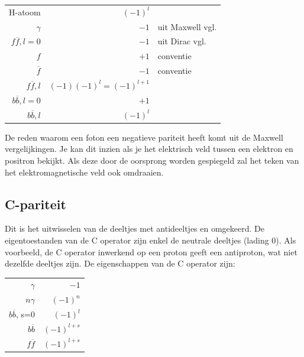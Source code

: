 \documentclass[../main.tex]{subfiles}
\begin{document}
\begin{table}[h]
    \centering
    \label{tab:par_eig}
    \begin{tabular}{r|rl}
        H-atoom             & $(-1)^l$                  &                   \\
        $\gamma$            & $-1$                      & uit Maxwell vgl.  \\
        $f\overline f,l=0$  & $-1$                      & uit Dirac vgl.    \\
        $f$                 & $+1$                      & conventie         \\
        $\overline f$       & $-1$                      & conventie         \\
        $f\overline f,l$    & $(-1)(-1)^l=(-1)^{l+1}$   &                   \\
        $b\overline b,l=0$  & $+1$                      &                   \\
        $b\overline b,l$    & $(-1)^l$                  &                   \\
    \end{tabular}
\end{table}

De reden waarom een foton een negatieve pariteit heeft komt uit de Maxwell vergelijkingen. Je kan dit inzien als je het elektrisch veld tussen een elektron en positron bekijkt. Als deze door de oorsprong worden gespiegeld zal het teken van het elektromagnetische veld ook omdraaien.

\subsection{C-pariteit}%
\label{sub:c_pariteit}

Dit is het uitwisselen van de deeltjes met antideeltjes en omgekeerd. De eigentoestanden van de C operator zijn enkel de neutrale deeltjes (lading 0). Als voorbeeld, de C operator inwerkend op een proton geeft een antiproton, wat niet dezelfde deeltjes zijn. De eigenschappen van de C operator zijn:

\begin{table}[h]
    \centering
    \label{tab:c_eig}
    \begin{tabular}{r|r}
        $\gamma$        & $-1$          \\
        $n\gamma$       & $(-1)^n$      \\
        $b \overline b$, s=0 & $(-1)^{l}$  \\
        $b \overline b$ & $(-1)^{l+s}$  \\
        $f \overline f$ & $(-1)^{l+s}$  \\
    \end{tabular}
\end{table}
\end{document}
